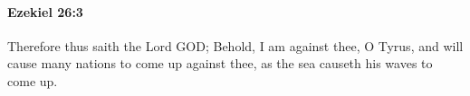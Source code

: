 
		\paragraph{Ezekiel 26:3} %
			\label{EZEKIEL-26-3}

			Therefore thus saith the Lord GOD; Behold, I am against thee, O Tyrus, and will cause many nations to come up against thee, as the sea causeth his waves to come up.


